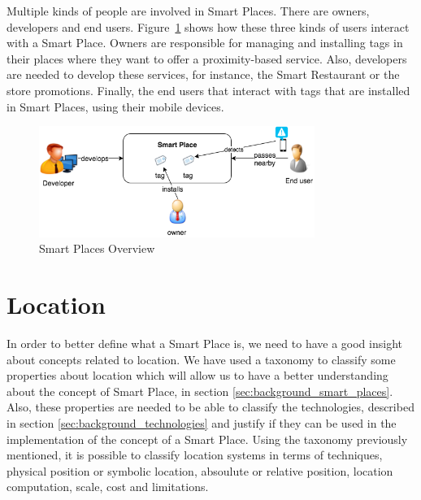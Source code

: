 Multiple kinds of people are involved in Smart Places.
There are owners, developers and end users.
Figure~\ref{fig:smart_places_overview} shows how these three kinds of users interact with a Smart Place.
Owners are responsible for managing and installing tags in their places where they want to offer a proximity-based service.
Also, developers are needed to develop these services, for instance, the Smart Restaurant or the store promotions.
Finally, the end users that interact with tags that are installed in Smart Places, using their mobile devices.

\begin{figure}[!ht]
  \centering
    \includegraphics[width=0.8\textwidth, keepaspectratio]{images/smart_places_overview}
    \caption[Smart Places Overview]{Smart Places Overview}
    \label{fig:smart_places_overview}
\end{figure}

\section{Location}
\label{sec:background_location}
In order to better define what a Smart Place is, we need to have a good insight about concepts related to location.
We have used a taxonomy\cite{location} to classify some properties about location which will allow us to have a better understanding about the concept of Smart Place, in section \ref{sec:background_smart_places}.
Also, these properties are needed to be able to classify the technologies, described in section \ref{sec:background_technologies} and justify if they can be used in the implementation of the concept of a Smart Place.
Using the taxonomy previously mentioned, it is possible to classify location systems in terms of techniques, physical position or symbolic location, absoulute or relative position, location computation, scale, cost and limitations.

